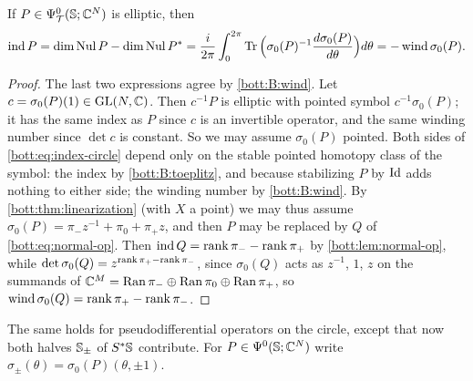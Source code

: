 \begin{corollary}\label{bott:cor:index-circle}
  If $P\in\Psi^{0}_{\mathcal{T}}(\mathbb{S};\mathbb{C}^N)$ is elliptic, then
  \begin{equation}\label{bott:eq:index-circle}
    \operatorname{ind} P=\dim\operatorname{Nul} P-\dim\operatorname{Nul} P^*=\frac{i}{2\pi}\int_0^{2\pi}\operatorname{Tr}\Big(\sigma_0(P)^{-1}\frac{d\sigma_0(P)}{d\theta}\Big)d\theta
    =-\operatorname{wind}\sigma_0(P).
  \end{equation}
\end{corollary}
\begin{proof}
  The last two expressions agree by \ref{bott:B:wind}. Let $c=\sigma_0(P)(1)\in\operatorname{GL}(N,\mathbb{C})$.
  Then $c^{-1}P$ is elliptic with pointed symbol $c^{-1}\sigma_0(P)$; it has the same
  index as $P$ since $c$ is an invertible operator, and the same winding number since
  $\det c$ is constant. So we may assume $\sigma_0(P)$ pointed. Both sides of
  \eqref{bott:eq:index-circle} depend only on the stable pointed homotopy class of the
  symbol: the index by \ref{bott:B:toeplitz}, and because stabilizing $P$ by $\operatorname{Id}$ adds
  nothing to either side; the winding number by \ref{bott:B:wind}. By
  \cref{bott:thm:linearization} (with $X$ a point) we may thus assume
  $\sigma_0(P)=\pi_-z^{-1}+\pi_0+\pi_+z$, and then $P$ may be replaced by $Q$ of
  \eqref{bott:eq:normal-op}. Then $\operatorname{ind} Q=\operatorname{rank}\pi_--\operatorname{rank}\pi_+$ by
  \cref{bott:lem:normal-op}, while $\det\sigma_0(Q)=z^{\operatorname{rank}\pi_+-\operatorname{rank}\pi_-}$, since $\sigma_0(Q)$
  acts as $z^{-1}$, $1$, $z$ on the summands of $\mathbb{C}^M=\operatorname{Ran}\pi_-\oplus\operatorname{Ran}\pi_0\oplus\operatorname{Ran}\pi_+$, so $\operatorname{wind}\sigma_0(Q)=\operatorname{rank}\pi_+-\operatorname{rank}\pi_-$.
\end{proof}

The same holds for pseudodifferential operators on the circle, except that now both
halves $\mathbb{S}_\pm$ of $S^*\mathbb{S}$ contribute. For $P\in\Psi^{0}(\mathbb{S};\mathbb{C}^N)$
write $\sigma_\pm(\theta)=\sigma_0(P)(\theta,\pm1)$.

